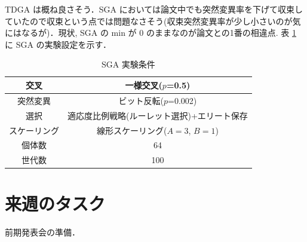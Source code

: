 \documentclass[onecolumn]{ujarticle}   %
\begin{document}
	TDGA は概ね良さそう．SGA においては論文中でも突然変異率を下げて収束していたので収束という点では問題なさそう(収束突然変異率が少し小さいのが気にはなるが)．現状, SGA の min が 0 のままなのが論文との1番の相違点.
	表 \ref{tab:exp_condition_SGA} に SGA の実験設定を示す．

	\begin{table}[h]
		\centering
		\caption{SGA 実験条件}
		\label{tab:exp_condition_SGA}
		\begin{tabular}{|c||c|} \hline
			交叉&一様交叉($p$=0.5)\\ \hline
			突然変異&ビット反転($p$=0.002)\\ \hline
			選択&適応度比例戦略(ルーレット選択)+エリート保存\\ \hline
			スケーリング&線形スケーリング($A=3$, $B=1$)\\ \hline
			個体数&64\\ \hline
			世代数&100\\ \hline
		\end{tabular}
	\end{table}


	\section{来週のタスク}
	前期発表会の準備．

\end{document}
